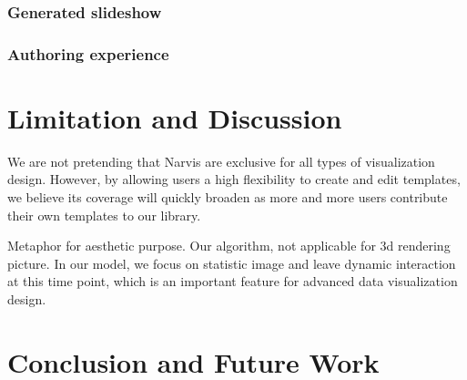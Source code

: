 \documentclass[review,journal]{vgtc}         %
\begin{document}
\subsubsection{Generated slideshow}
\subsubsection{Authoring experience}
\section{Limitation and Discussion}
We are not pretending that Narvis are exclusive for all types of visualization design. However, by allowing users a high flexibility to create and edit templates, we believe its coverage  will quickly broaden as more and more users contribute their own templates to our library. \par
Metaphor for aesthetic purpose.
Our algorithm, not applicable for 3d rendering picture. 
In our model, we focus on statistic image and leave dynamic interaction at this time point, which is an important feature for advanced data visualization design. 
\section{Conclusion and Future Work}

%

%
%
%


\end{document}
